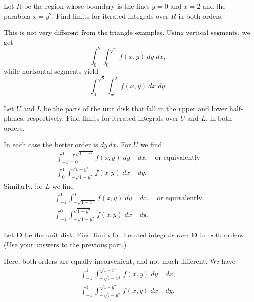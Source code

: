 \documentclass[]{exam}
\begin{document}
\begin{questions}
\question Let $R$ be the region whose boundary is the lines $y = 0$ and $x = 2$ and the parabola $x = y^2$. Find limits for iterated integrals over $R$ in both orders.
\begin{solution}
    This is not very different from the triangle examples. Using vertical segments, we get
    \begin{equation*}
        \int_{0}^{2} \int_{0}^{\sqrt{x}} f(x,y) \; dy \; dx,
    \end{equation*}
    while horizontal segments yield
    \begin{equation*}
        \int_{0}^{\sqrt{2}} \int_{y^2}^{2} f(x,y) \; dx \; dy.
    \end{equation*}
\end{solution}

\question Let $U$ and $L$ be the parts of the unit disk that fall in the upper and lower half-planes, respectively. Find limits for iterated integrals over $U$ and $L$, in both orders.

\begin{solution}
    In each case the better order is $dy \; dx$. For $U$ we find
    \begin{align*}
        \int_{-1}^{1} \int_{0}^{\sqrt{1-x^2}} f(x,y) \; dy &\; dx, \quad \text{or equivalently} \\
        \int_{0}^{1} \int_{-\sqrt{1-y^2}}^{\sqrt{1-y^2}} f(x,y) \; dx &\; dy.
    \end{align*}
    Similarly, for $L$ we find 
    \begin{align*}
        \int_{-1}^{1} \int_{-\sqrt{1-x^2}}^{0} f(x,y) \; dy &\; dx, \quad \text{or equivalently} \\
        \int_{-1}^{0} \int_{-\sqrt{1-y^2}}^{\sqrt{1-y^2}} f(x,y) \; dx &\; dy.
    \end{align*}
\end{solution}

\question Let $\mathbf{D}$ be the unit disk. Find limits for iterated integrals over $\mathbf{D}$ in both orders. (Use your answers to the previous part.)

\begin{solution}
    Here, both orders are equally inconvenient, and not much different. We have
    \begin{align*}
        \int_{-1}^{1} \int_{-\sqrt{1-x^2}}^{\sqrt{1-x^2}} f(x,y) \; dy &\; dx, \\
        \int_{-1}^{1} \int_{-\sqrt{1-y^2}}^{\sqrt{1-y^2}} f(x,y) \; dx &\; dy.
    \end{align*}
\end{solution}


\end{questions}
\end{document}

